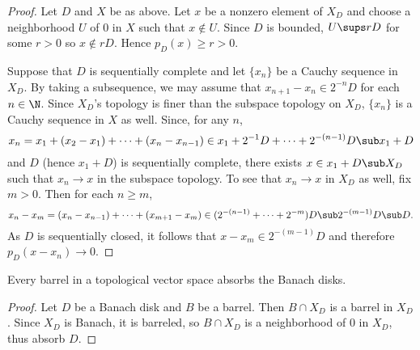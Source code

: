\begin{proof}
Let $D$ and $X$ be as above. Let $x$ be a nonzero element of $X_D$ and choose a neighborhood $U$ of $0$ in $X$ such that $x\notin U$. Since $D$ is bounded, $U\sups rD$ for some $r>0$ so $x\notin rD$. Hence $p_D(x)\geq r>0$.\par
Suppose that $D$ is sequentially complete and let $\{x_n\}$ be a Cauchy sequence in $X_D$. By taking a subsequence, we may assume that $x_{n+1}-x_n\in 2^{-n}D$ for each $n\in\N$. Since $X_D$'s topology is finer than the subspace topology on $X_D$, $\{x_n\}$ is a Cauchy sequence in $X$ as well. Since, for any $n$,
\[x_n=x_1+(x_2-x_1)+\cdots+(x_n-x_{n-1})\in x_1+2^{-1}D+\cdots+2^{-(n-1)}D\sub x_1+D\]
and $D$ (hence $x_1+D$) is sequentially complete, there exists $x\in x_1+D\sub X_D$ such that $x_n\to x$ in the subspace topology. To see that $x_n\to x$ in $X_D$ as well, fix $m>0$. Then for each $n\geq m$,
\[x_n-x_m=(x_n-x_{n-1})+\cdots+(x_{m+1}-x_m)\in(2^{-(n-1)}+\cdots+2^{-m})D\sub 2^{-(m-1)}D\sub D.\]
As $D$ is sequentially closed, it follows that $x-x_m\in 2^{-(m-1)}D$ and therefore $p_D(x-x_n)\to 0$.
\end{proof}
\begin{theorem}\label{TVS barrel absorb Banach disk}
Every barrel in a topological vector space absorbs the Banach disks.
\end{theorem}
\begin{proof}
Let $D$ be a Banach disk and $B$ be a barrel. Then $B\cap X_D$ is a barrel in $X_D$. Since $X_D$ is Banach, it is barreled, so $B\cap X_D$ is a neighborhood of $0$ in $X_D$, thus absorb $D$. 
\end{proof}
